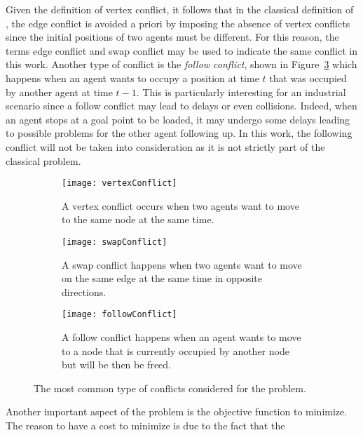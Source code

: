 Given the definition of vertex conflict, it follows that in the classical
definition of , the edge conflict is avoided a priori by imposing
the absence of vertex conflicts since the initial positions of two agents must 
be different. For this reason, the terms edge conflict and swap conflict may be
used to indicate the same conflict in this work. \newline
Another type of conflict is the \textit{follow conflict}, shown in
Figure~\ref{fig:followConflict} which happens when an agent wants to occupy a
position at time $t$ that was occupied by another agent at time $t-1$. This
is particularly interesting for an industrial scenario since a follow conflict
may lead to delays or even collisions. Indeed, when an agent stops at a goal
point to be loaded, it may undergo some delays leading to possible problems for
the other agent following up. In this work, the following conflict will not be
taken into consideration as it is not strictly part of the classical
 problem.
\begin{figure}[tb]
  \centering
  \begin{subfigure}[t]{0.3\linewidth}
    \centering
    \texttt{[image: vertexConflict]}
    \caption{A vertex conflict occurs when two agents want to move to the same
    node at the same time.}
    \label{fig:vertexConflict}
  \end{subfigure}
  \hfill{}
  \begin{subfigure}[t]{0.3\linewidth}
    \centering
    \texttt{[image: swapConflict]}
    \caption{A swap conflict happens when two agents want to move on the same
    edge at the same time in opposite directions.}
    \label{fig:swapConflict}
  \end{subfigure}
  \hfill{}
  \begin{subfigure}[t]{0.3\linewidth}
    \centering
    \texttt{[image: followConflict]}
    \caption{A follow conflict happens when an agent wants to move to a node
    that is currently occupied by another node but will be then be freed.}
    \label{fig:followConflict}
  \end{subfigure}
  \caption{The most common type of conflicts considered for the 
  problem.}
  \label{fig:conflicts}
\end{figure} \newline
Another important aspect of the  problem is the objective function
to minimize. The reason to have a cost to minimize is due to the fact that the
